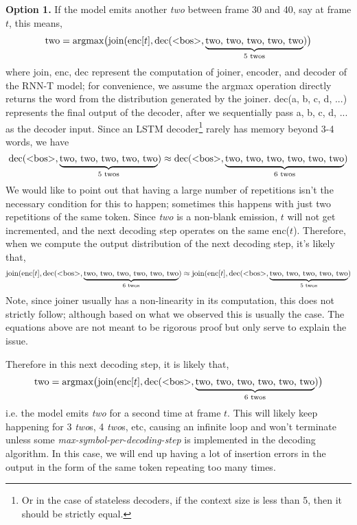 \documentclass{article}
\begin{document}
\textbf{Option 1.} If the model emits another \emph{two} between frame 30 and 40, say at frame $t$, this means,
\begin{equation}
    \text{two} = \text{argmax} \big( \text{join}(\text{enc}[t], \text{dec(\textless bos\textgreater,} \underbrace{\text{two, two, two, two, two}}_\text{5 twos} ) \big)
\end{equation}
where join, enc, dec represent the computation of joiner, encoder, and decoder of the RNN-T model; for convenience, we assume the argmax operation directly returns the word from the distribution generated by the joiner. dec(a, b, c, d, ...) represents the final output of the decoder, after we sequentially pass a, b, c, d, ... as the decoder input. Since an LSTM decoder\footnote{Or in the case of stateless decoders, if the context size is less than 5, then it should be strictly equal.} rarely has memory beyond 3-4 words, we have 
\begin{equation}
\text{dec(\textless bos\textgreater}, \underbrace{\text{two, two, two, two, two}}_\text{5 twos}) \approx \text{dec(\textless bos\textgreater}, \underbrace{\text{two, two, two, two, two, two}}_\text{6 twos})
\end{equation}
We would like to point out that having a large number of repetitions isn't the necessary condition for this to happen; sometimes this happens with just two repetitions of the same token. 
Since \emph{two} is a non-blank emission, $t$ will not get incremented, and the next decoding step operates on the same enc($t$). 
Therefore, when we compute the output distribution of the next decoding step, it's likely that,
\begin{equation}
    \text{join}(\text{enc}[t], \text{dec(\textless bos\textgreater}, \underbrace{\text{two, two, two, two, two, two}}_\text{6 twos}) \approx \text{join}(\text{enc}[t], \text{dec(\textless bos\textgreater}, \underbrace{\text{two, two, two, two, two}}_\text{5 twos}) 
\end{equation}
Note, since joiner usually has a non-linearity in its computation, this does not strictly follow; although based on what we observed this is usually the case. The equations above are not meant to be rigorous proof but only serve to explain the issue.

Therefore in this next decoding step, it is likely that,
\begin{equation}
    \text{two} = \text{argmax} \big( \text{join}(\text{enc}[t], \text{dec(\textless bos\textgreater}, \underbrace{\text{two, two, two, two, two, two}}_\text{6 twos}) \big)
\end{equation}
i.e. the model emits \emph{two} for a second time at frame $t$. 
This will likely keep happening for 3 \emph{two}s, 4 \emph{two}s, etc, causing an infinite loop and won't terminate unless some \emph{max-symbol-per-decoding-step} is implemented in the decoding algorithm. In this case, we will end up having a lot of insertion errors in the output in the form of the same token repeating too many times.
\end{document}
